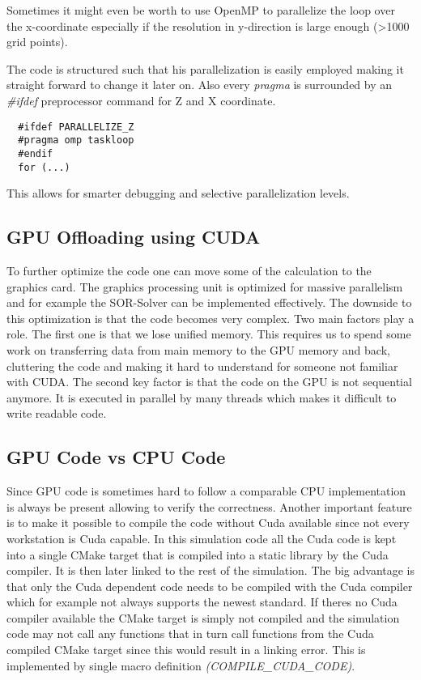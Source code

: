 \documentclass[master.tex]{subfiles}
\begin{document}
\begin{blockquote}
  \small
  Sometimes it might even be worth to use OpenMP to parallelize the loop over the x-coordinate especially if the resolution in y-direction is large enough (\textgreater 1000 grid points).
\end{blockquote}
The code is structured such that his parallelization is easily employed making it straight forward to change it later on. Also every \textit{pragma} is surrounded by an \textit{\#ifdef} preprocessor command for Z and X coordinate.
\begin{lstlisting}
  #ifdef PARALLELIZE_Z
  #pragma omp taskloop
  #endif
  for (...)
\end{lstlisting}
This allows for smarter debugging and selective parallelization levels.

\subsection{GPU Offloading using CUDA}
To further optimize the code one can move some of the calculation to the graphics card. The graphics processing unit is optimized for massive parallelism and for example the SOR-Solver can be implemented effectively. The downside to this optimization is that the code becomes very complex. Two main factors play a role. The first one is that we lose unified memory. This requires us to spend some work on transferring data from main memory to the GPU memory and back, cluttering the code and making it hard to understand for someone not familiar with CUDA. The second key factor is that the code on the GPU is not sequential anymore. It is executed in parallel by many threads which makes it difficult to write readable code.\newline

\subsection{GPU Code vs CPU Code}
Since GPU code is sometimes hard to follow a comparable CPU implementation is always be present allowing to verify the correctness.\newline
Another important feature is to make it possible to compile the code without Cuda available since not every workstation is Cuda capable. In this simulation code all the Cuda code is kept into a single CMake target that is compiled into a static library by the Cuda compiler. It is then later linked to the rest of the simulation. The big advantage is that only the Cuda dependent code needs to be compiled with the Cuda compiler which for example not always supports the newest standard. If theres no Cuda compiler available the CMake target is simply not compiled and the simulation code may not call any functions that in turn call functions from the Cuda compiled CMake target since this would result in a linking error. This is implemented by single macro definition \textit{(COMPILE\_CUDA\_CODE)}.
\end{document}
